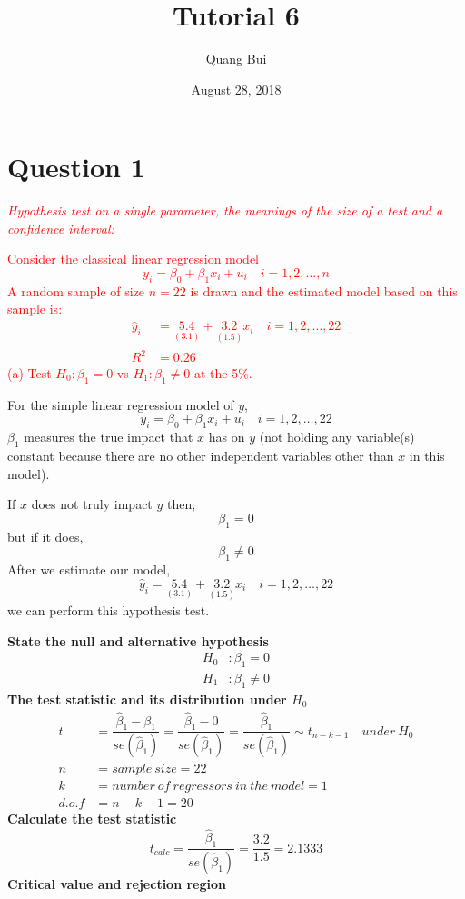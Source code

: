\documentclass[12pt]{report}
\title{Tutorial 6}
\subtitle
{
\textbf{keywords}: hypothesis testing, t-test, F-test, test statistic, critical value, confidence intervals, R-squared, interpretation of coefficients, multiple linear regression, reparameterisation

\textbf{estimated reading time}: 33 minutes
}
\author{Quang Bui}
\date{August 28, 2018}
\begin{document}
\maketitle

\section*{Question 1}
\noindent \textcolor{red}{\textit{Hypothesis test on a single parameter, the meanings of the size of a test and a confidence interval:}}

\noindent \textcolor{red}{Consider the classical linear regression model $$y_i = \beta_0 + \beta_1 x_i + u_i \quad i=1,2,\dots,n$$ A random sample of size $n=22$ is drawn and the estimated model based on this sample is:
\begin{align*}
	\hat{y}_i &= \underset{(3.1)}{5.4} + \underset{(1.5)}{3.2}x_i \quad i=1,2,\dots,22 \\
	R^2 &= 0.26 
\end{align*} (a) Test $H_0: \beta_1 = 0$ vs $H_1: \beta_1 \neq 0$ at the 5\%.}

\noindent For the simple linear regression model of $y$, $$y_i = \beta_0 + \beta_1 x_i + u_i \quad i=1,2,\dots,22$$ $\beta_1$ measures the true impact that $x$ has on $y$ (not holding any variable(s) constant because there are no other independent variables other than $x$ in this model). 

\noindent If $x$ does not truly impact $y$ then, $$\beta_1 = 0$$ but if it does,  $$\beta_1 \neq 0$$ After we estimate our model, $$\hat{y}_i = \underset{(3.1)}{5.4} + \underset{(1.5)}{3.2}x_i \quad i=1,2,\dots,22$$ we can perform this hypothesis test.

\noindent \textbf{State the null and alternative hypothesis}
\begin{align*}
H_0&: \beta_1 = 0 \\
H_1&: \beta_1 \neq 0
\end{align*}
\noindent \textbf{The test statistic and its distribution under $H_0$}
\begin{align*}
t &= \dfrac{\hat{\beta}_1 - \beta_1}{se(\hat{\beta}_1)} = \dfrac{\hat{\beta}_1 - 0}{se(\hat{\beta}_1)} = \dfrac{\hat{\beta}_1}{se(\hat{\beta}_1)} \sim t_{n-k-1} \quad under\ H_0 \\
n &= sample\ size = 22 \\
k &= number\ of\ regressors\ in\ the\ model = 1 \\
d.o.f &= n-k-1=20
\end{align*}
\noindent \textbf{Calculate the test statistic}
$$t_{calc} = \dfrac{\hat{\beta}_1}{se(\hat{\beta}_1)} = \dfrac{3.2}{1.5} = 2.1333$$
\noindent \textbf{Critical value and rejection region}
\end{document}
